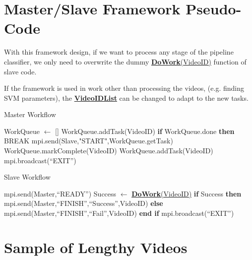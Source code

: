 \documentclass[bsc,frontabs,twoside,fullspacing,parskip,deptreport]{infthesis}
\begin{document}
\begin{appendices}

\chapter{Master/Slave Framework Pseudo-Code}
\label{apped:msf}

With this framework design, if we want to process any stage of the pipeline classifier, we only need to overwrite the dummy \underline{\textbf{DoWork}(VideoID)} function of slave code.

If the framework is used in work other than processing the videos, (e.g. finding SVM parameters), the  \underline{\textbf{VideoIDList}} can be changed to adapt to the new tasks.

\begin{algorithm}
\caption{Master Workflow}
\begin{algorithmic}
\STATE WorkQueue $\leftarrow$ []
	\STATE WorkQueue.addTask(VideoID)
\ENDFOR
{}
		\STATE \textbf{if} WorkQueue.done \textbf{then} BREAK 
		\STATE mpi.send(Slave,"START",WorkQueue.getTask)
	\ENDFOR
		\STATE WorkQueue.markComplete(VideoID)
			\STATE WorkQueue.addTask(VideoID)
		\ENDIF
	\ENDFOR
\ENDWHILE
\STATE mpi.broadcast(``EXIT'')
\end{algorithmic} 
\end{algorithm}

\begin{algorithm}
\caption{Slave Workflow}
\begin{algorithmic}
	\STATE mpi.send(Master,``READY'')
		\STATE Success $\leftarrow$ \underline{\textbf{DoWork}(VideoID)}
		\STATE \textbf{if} Success \textbf{then}
		\STATE \hspace{10pt}mpi.send(Master,``FINISH'',``Success'',VideoID)
		\STATE \textbf{else}
		\STATE \hspace{10pt}mpi.send(Master,``FINISH'',``Fail'',VideoID)
		\STATE \textbf{end if}
	\ENDIF
\ENDWHILE
\STATE mpi.broadcast(``EXIT'')
\end{algorithmic} 
\end{algorithm}

\chapter{Sample of Lengthy Videos}
\label{append:samplelong}


\end{appendices}
\end{document}
